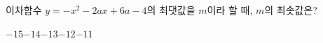 이차함수 $y=-x^2-2ax+6a-4$의 최댓값을 $m$이라 할 때, $m$의 최솟값은? 
\begin{choices32}{$-15$}{$-14$}{$-13$}{$-12$}{$-11$}\end{choices32}
